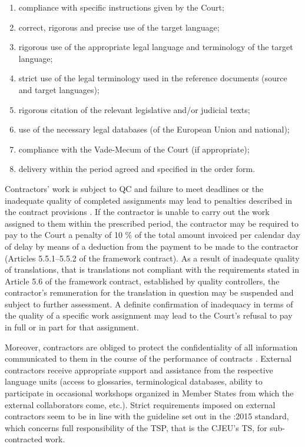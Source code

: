 \documentclass[output=paper]{langsci/langscibook}
\begin{document}
\begin{enumerate}
\item 
compliance with specific instructions given by the Court;
\item 
correct, rigorous and precise use of the target language;
\item 
rigorous use of the appropriate legal language and terminology of the target language;
\item 
strict use of the legal terminology used in the reference documents (source and target languages);
\item 
rigorous citation of the relevant legislative and/or judicial texts;
\item 
use of the necessary legal databases (of the European Union and national);
\item 
compliance with the Vade-Mecum of the Court (if appropriate);
\item 
delivery within the period agreed and specified in the order form. 
\end{enumerate}

Contractors’ work is subject to QC and failure to meet deadlines or the inadequate quality of completed assignments may lead to penalties described in the contract provisions \citep[11]{FCPTS2017}. If the contractor is unable to carry out the work assigned to them within the prescribed period, the contractor may be required to pay to the Court a penalty of 10 \% of the total amount invoiced per calendar day of delay by means of a deduction from the payment to be made to the contractor (Articles 5.5.1–5.5.2 of the framework contract). As a result of inadequate quality of translations, that is translations not compliant with the requirements stated in Article 5.6 of the framework contract, established by quality controllers, the contractor’s remuneration for the translation in question may be suspended and subject to further assessment. A definite confirmation of inadequacy in terms of the quality of a specific work assignment may lead to the Court’s refusal to pay in full or in part for that assignment.

Moreover, contractors are obliged to protect the confidentiality of all information communicated to them in the course of the performance of contracts \citep[16]{FCPTS2017}. External contractors receive appropriate support and assistance from the respective language units (access to glossaries, terminological databases, ability to participate in occasional workshops organized in Member States from which the external collaborators come, etc.). Strict requirements imposed on external contractors seem to be in line with the guideline set out in the \citeauthor{ISO2015}:2015 standard, which concerns full responsibility of the TSP, that is the CJEU’s TS, for sub-contracted work.
\end{document}
